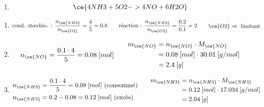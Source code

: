\documentclass[
  11pt,
  a4paper,
  openany]{book}
\providecommand{\tightlist}{%
  \setlength{\itemsep}{0pt}\setlength{\parskip}{0pt}}
\begin{document}
\begin{Answer}

\begin{enumerate}
\def\labelenumi{\arabic{enumi}.}
\tightlist
\item
  \[ \ce{4 NH3 + 5 O2 -> 4 NO + 6 H2O} \]
\end{enumerate}

\begin{enumerate}
\def\labelenumi{\alph{enumi}.}
\item
  \[ \begin{split}
           \text{cond. stœchio. : }\frac{n_{\ce{NH3}}}{n_{\ce{O2}}} = \frac{4}{5} = 0.8
       \end{split}
       \qquad
       \begin{split}
           \text{réaction : }\frac{n_{\ce{NH3}}}{n_{\ce{O2}}} = \frac{0.2}{0.1} = 2
       \end{split}
       \qquad
       \begin{split}
           \ce{O2} \Rightarrow\text{ limitant}
       \end{split} \]
\item
  \[ \begin{split}
           n_{\ce{NO}} = \frac{0.1 \cdot 4}{5} = 0.08\:[mol]
       \end{split}
       \qquad
       \begin{split}
           m_{\ce{NO}} &= n_{\ce{NO}} \cdot M_{\ce{NO}} \\
           &= 0.08\:[mol] \cdot 30.01\:[g/mol] \\
           &= 2.4\:[g]
       \end{split} \]
\item
  \[ \begin{split}
           n_{\ce{NH3}} &= \frac{0.1 \cdot 4}{5} = 0.08\:[mol] \text{ (consommé)} \\
           n_{\ce{NH3}} &= 0.2 - 0.08 = 0.12\:[mol] \text{ (excès)}
       \end{split}
       \qquad
       \begin{split}
           m_{\ce{NH3}} &= n_{\ce{NH3}} \cdot M_{\ce{NH3}} \\
           &= 0.12\:[mol] \cdot 17.034\:[g/mol] \\
           &= 2.04\:[g]
       \end{split} \]
\end{enumerate}

\end{Answer}
\end{document}
